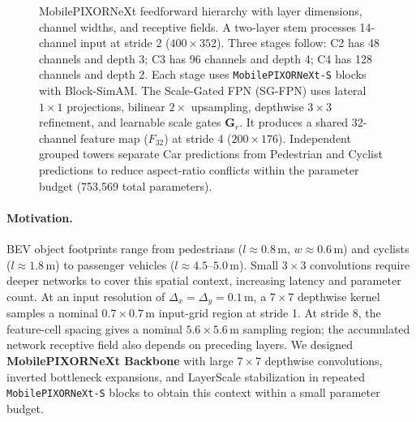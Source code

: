 \begin{figure}[t]
    \centering
    \caption{MobilePIXORNeXt feedforward hierarchy with layer dimensions, channel widths, and receptive fields. A two-layer stem processes 14-channel input at stride 2 ($400 \times 352$). Three stages follow: C2 has 48 channels and depth 3; C3 has 96 channels and depth 4; C4 has 128 channels and depth 2. Each stage uses \texttt{MobilePIXORNeXt-S} blocks with Block-SimAM. The Scale-Gated FPN (SG-FPN) uses lateral $1 \times 1$ projections, bilinear $2\times$ upsampling, depthwise $3 \times 3$ refinement, and learnable scale gates $\mathbf{G}_r$. It produces a shared 32-channel feature map ($F_{32}$) at stride 4 ($200 \times 176$). Independent grouped towers separate Car predictions from Pedestrian and Cyclist predictions to reduce aspect-ratio conflicts within the parameter budget (753,569 total parameters).}
    \label{fig:backbone}
\end{figure}


\paragraph{Motivation.}
BEV object footprints range from pedestrians ($l \approx 0.8$\,m, $w \approx 0.6$\,m) and cyclists ($l \approx 1.8$\,m) to passenger vehicles ($l \approx 4.5$--$5.0$\,m). Small $3 \times 3$ convolutions require deeper networks to cover this spatial context, increasing latency and parameter count. At an input resolution of $\Delta_x = \Delta_y = 0.1$\,m, a $7 \times 7$ depthwise kernel samples a nominal $0.7 \times 0.7$\,m input-grid region at stride 1. At stride 8, the feature-cell spacing gives a nominal $5.6 \times 5.6$\,m sampling region; the accumulated network receptive field also depends on preceding layers. We designed \textbf{MobilePIXORNeXt Backbone} with large $7 \times 7$ depthwise convolutions, inverted bottleneck expansions, and LayerScale stabilization in repeated \texttt{MobilePIXORNeXt-S} blocks to obtain this context within a small parameter budget.

